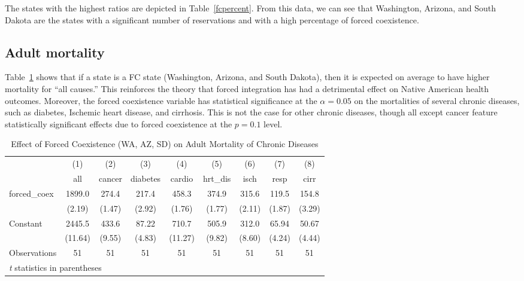 \documentclass[12pt]{article}
\begin{document}
The states with the highest ratios are depicted in Table~\ref{fcpercent}.  From this data, we can see that Washington, Arizona, and South Dakota are the states with a significant number of reservations and with a high percentage of forced coexistence.



\subsection{Adult mortality}
Table~\ref{fc1} shows that if a state is a FC state (Washington, Arizona, and South Dakota), then it is expected on average to have higher mortality for ``all causes.'' 
This reinforces the theory that forced integration has had a detrimental effect on Native American health outcomes. 
Moreover, the forced coexistence variable has statistical significance at the $\alpha = 0.05$ on the mortalities of several chronic diseases, such as diabetes, Ischemic heart disease, and cirrhosis.
This is not the case for other chronic diseases, though all except cancer feature statistically significant effects due to forced coexistence at the $p=0.1$ level.

\begin{table}[htbp]\centering \caption{Effect of Forced Coexistence (WA, AZ, SD) on Adult Mortality of Chronic Diseases\label{fc1}} \begin{tabular}{l*{8}{c}} \toprule
                    &\multicolumn{1}{c}{(1)}&\multicolumn{1}{c}{(2)}&\multicolumn{1}{c}{(3)}&\multicolumn{1}{c}{(4)}&\multicolumn{1}{c}{(5)}&\multicolumn{1}{c}{(6)}&\multicolumn{1}{c}{(7)}&\multicolumn{1}{c}{(8)}\\
                    &\multicolumn{1}{c}{all}&\multicolumn{1}{c}{cancer}&\multicolumn{1}{c}{diabetes}&\multicolumn{1}{c}{cardio}&\multicolumn{1}{c}{hrt\_dis}&\multicolumn{1}{c}{isch}&\multicolumn{1}{c}{resp}&\multicolumn{1}{c}{cirr}\\
\midrule
forced\_coex         &      1899.0&       274.4&       217.4&       458.3&       374.9&       315.6&       119.5&       154.8\\
                    &      (2.19)&      (1.47)&      (2.92)&      (1.76)&      (1.77)&      (2.11)&      (1.87)&      (3.29)\\
\addlinespace
Constant            &      2445.5&       433.6&       87.22&       710.7&       505.9&       312.0&       65.94&       50.67\\
                    &     (11.64)&      (9.55)&      (4.83)&     (11.27)&      (9.82)&      (8.60)&      (4.24)&      (4.44)\\
\midrule
Observations        &          51&          51&          51&          51&          51&          51&          51&          51\\
\bottomrule
\multicolumn{9}{l}{\footnotesize \textit{t} statistics in parentheses}\\
\end{tabular}
\end{table}
\end{document}
